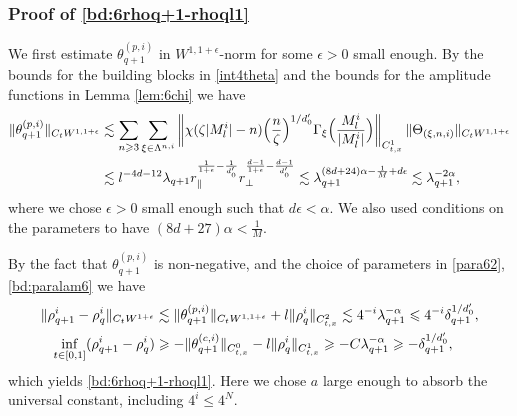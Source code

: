 \documentclass[UTF-8,reqno]{amsart}
\numberwithin{equation}{section}
\theoremstyle{definition}
\def\({{\Big(}}
\def\){{\Big)}}
\newcommand{\norm}[1]{\left\|#1\right\|}
\def\geq{\geqslant}
\def\leq{\leqslant}
\def\({{\Big(}}
\def\){{\Big)}}
\def\geq{\geqslant}
\def\leq{\leqslant}
\begin{document}
\subsubsection{Proof of   \eqref{bd:6rhoq+1-rhoql1}}
We first estimate $\theta_{q+1}^{(p,i)}$ in $W^{1,1+\epsilon}$-norm for some $\epsilon>0$ small enough. By the bounds for the building blocks in \eqref{int4theta}   and the bounds for the amplitude functions in Lemma \ref{lem:6chi} we have
\begin{align}
\|\theta_{q+1}^{(p,i)}\|_{C_tW^{1,1+\epsilon}}&\lesssim\sum_{n\geq3}\sum_{\xi\in\Lambda^{n,i}}\norm{\chi(\zeta|M^{i}_l|-n)\(\frac{n}{\zeta}\)^{1/d_0'}\Gamma_{\xi}\(\frac{M^{i}_l}{|M^{i}_l|}\)}_{C_{t,x}^1}\|\Theta_{(\xi,n,i)} \|_{C_tW^{1,1+\epsilon}} \notag\\ 
&\lesssim l^{-4d-12}\lambda_{q+1}r_\parallel^{\frac1{1+\epsilon}-\frac{1}{d_0'}}r_\perp^{\frac{d-1}{1+\epsilon}-\frac{d-1}{d_0'}}%
\lesssim\lambda_{q+1}^{(8d+24)\alpha-\frac1M+d\epsilon}\lesssim \lambda_{q+1}^{-2\alpha},\label{bd:6thteaq+1pw11}
\end{align}
where we  chose $\epsilon>0$ small enough such that $d\epsilon<\alpha$. We also used  conditions on the parameters to have $(8d+27)\alpha<\frac1M$. 

By the fact that $\theta_{q+1}^{(p,i)}$ is non-negative, and the choice of parameters in \eqref{para62}, \eqref{bd:paralam6}  we have
\begin{align}
\|\rho^{i}_{q+1}-\rho^{i}_q\|_{C_tW^{1+\epsilon}}
&\lesssim \|\theta_{q+1}^{(p,i)}\|_{C_tW^{1,1+\epsilon}}+l\|\rho_q^i\|_{C_{t,x}^2}\lesssim4^{-i}\lambda_{q+1}^{-\alpha}\leq 4^{-i}\delta_{q+1}^{1/d_0'},\notag\\
    \inf_{t\in [0,1]}(\rho^{i}_{q+1} - \rho^{i}_q)&\geq-\|\theta_{q+1}^{(c,i)}\|_{C_{t,x}^0} -l\|\rho_q^i\|_{C_{t,x}^1}\geq -C\lambda_{q+1}^{-\alpha} \geq -\delta_{q+1}^{1/d_0'},
\end{align}
which yields \eqref{bd:6rhoq+1-rhoql1}.  Here we chose $a$ large enough to absorb the universal constant, including $4^i\leq 4^N$. 
\end{document}
